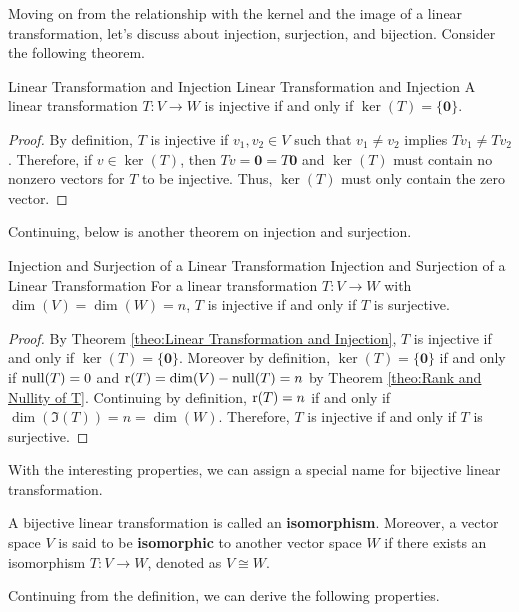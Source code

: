 \documentclass[../main.tex]{subfiles}
\begin{document}
Moving on from the relationship with the kernel and the image of a
linear transformation, let's discuss about injection, surjection,
and bijection. Consider the following theorem.

\begin{theorem}{Linear Transformation and Injection}
{Linear Transformation and Injection}
A linear transformation $T: V \to W$ is injective if and only if
$\ker(T) = \{ \mathbf{0} \}$.
\end{theorem}
\begin{proof}
By definition, $T$ is injective if $v_1, v_2 \in V$ such that
$v_1 \neq v_2$ implies $Tv_1 \neq Tv_2$. Therefore, if $v \in
\ker(T)$, then $Tv = \mathbf{0} = T\mathbf{0}$ and $\ker(T)$
must contain no nonzero vectors for $T$ to be injective.
Thus, $\ker(T)$ must only contain the zero vector.
\end{proof}

Continuing, below is another theorem on injection and surjection.

\begin{theorem}{Injection and Surjection of a Linear Transformation}
{Injection and Surjection of a Linear Transformation}
For a linear transformation $T: V \to W$ with $\dim(V) = \dim(W) = n$,
$T$ is injective if and only if $T$ is surjective.
\end{theorem}
\begin{proof}
By Theorem \ref{theo:Linear Transformation and Injection}, $T$ is
injective if and only if $\ker(T) = \{ \mathbf{0} \}$. Moreover by
definition, $\ker(T) = \{ \mathbf{0} \}$ if and only if $\operatorname{null}(T) = 0$
and $\operatorname{r}(T) = \dim(V) - \operatorname{null}(T) = n$ by Theorem \ref{theo:Rank and
Nullity of T}. Continuing by definition, $\operatorname{r}(T) = n$ if and only if
$\dim(\Im(T)) = n = \dim(W)$. Therefore, $T$ is injective if and only
if $T$ is surjective.
\end{proof}

With the interesting properties, we can assign a special name for
bijective linear transformation.

\begin{definition}
A bijective linear transformation is called an \textbf{isomorphism}.
Moreover, a vector space $V$ is said to be \textbf{isomorphic} to
another vector space $W$ if there exists an isomorphism $T: V \to W$,
denoted as $V \cong W$.
\end{definition}

Continuing from the definition, we can derive the following
properties.
\end{document}
